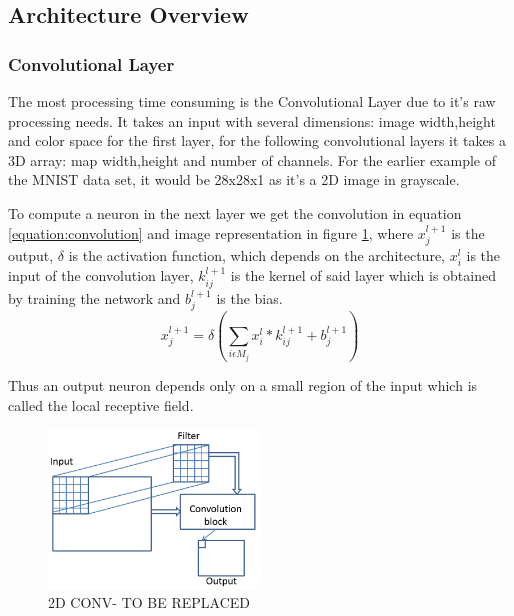  \subsection{Architecture Overview}
 \label{section:Aoverview}



 \subsubsection{Convolutional Layer}
\label{section:convlayer}

The most processing time consuming  is the Convolutional Layer due to it's raw processing needs. 
It takes an input with several dimensions: image width,height and color space for the first layer,
for the following convolutional layers it takes a 3D array: map width,height and number of channels.
For the earlier example of the MNIST
data set, it would be 28x28x1 as it's a 2D image in grayscale.

To compute a neuron in the next layer we get the convolution in equation \ref{equation:convolution} and image representation in figure \ref{Cl},
where $x_{j}^{l+1}$ is the output, $\delta$ is the activation function, which depends on the architecture, $x_{i}^{l}$ is the input of the convolution layer, $k_{ij}^{l+1}$ is
the kernel of said layer which is obtained by training the network and $b_{j}^{l+1}$ is the bias.
\begin{equation} \label{equation:convolution}
    \displaystyle x_{j}^{l+1}=\delta (\sum_{i \epsilon M_{j}}x_{i}^{l} * k_{ij}^{l+1}+ b_{j}^{l+1})
\end{equation}

Thus an output neuron depends only on a small region of the input which is called the local receptive field. 

\begin{figure}[!htbp]
    \centering
    \includegraphics[width=0.5\textwidth]{Figures/convolution.png}
    \caption{2D CONV- TO BE REPLACED}
    \label{Cl}
\end{figure} 

